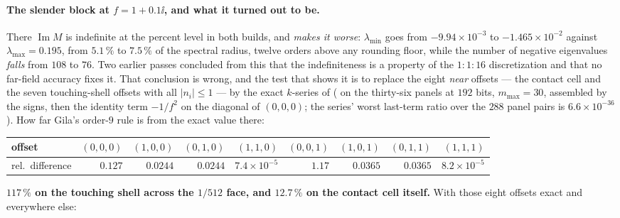 \paragraph{The slender block at $f = 1+0.1\ii$, and what it turned out to be.} There
$\operatorname{Im}M$ is indefinite at the percent level in both builds, and
\emph{ makes it worse}: $\lambda_{\min}$ goes from $-9.94\times10^{-3}$ to
$-1.465\times10^{-2}$ against $\lambda_{\max} = 0.195$, from $5.1\,\%$ to $7.5\,\%$ of the
spectral radius, twelve orders above any rounding floor, while the number of negative
eigenvalues \emph{falls} from $108$ to $76$. Two earlier passes concluded from this that the
indefiniteness is a property of the $1{:}1{:}16$ discretization and that no far-field
accuracy fixes it. That conclusion is wrong, and the test that shows it is to replace the
eight \emph{near} offsets --- the contact cell and the seven touching-shell offsets with all
$|n_i| \le 1$ --- by the exact $k$-series of 
( on the thirty-six  panels at $192$ bits, $m_{\max} = 30$,
assembled by the  signs, then the identity term $-1/f^2$ on the diagonal of
$(0,0,0)$; the series' worst last-term ratio over the $288$ panel pairs is
$6.6\times10^{-36}$). How far Gila's order-$9$ rule is from the exact value there:

\begin{center}\footnotesize
\begin{tabular}{@{}lrrrrrrrr@{}}
\toprule
offset & $(0,0,0)$ & $(1,0,0)$ & $(0,1,0)$ & $(1,1,0)$ & $(0,0,1)$ & $(1,0,1)$ &
$(0,1,1)$ & $(1,1,1)$\\
\midrule
rel.\ difference &
$0.127$ & $0.0244$ & $0.0244$ & $7.4\times10^{-5}$ & $\mathbf{1.17}$ & $0.0365$ &
$0.0365$ & $8.2\times10^{-5}$\\
\bottomrule
\end{tabular}
\end{center}

\noindent
\textbf{$117\,\%$ on the touching shell across the $1/512$ face, and $12.7\,\%$ on the
contact cell itself.} With those eight offsets exact and  everywhere else:

